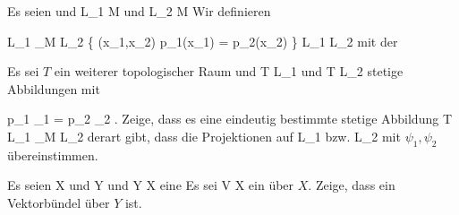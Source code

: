 {}
{





Es seien
und
 {L_1 } { M
} {}
und
 {L_2 } { M
} {}
Wir definieren

\mavergleichskettedisp
{\vergleichskette
{L_1 \times_M L_2
}
{ } { \left\{ (x_1,x_2)  \mid   p_1(x_1) = p_2(x_2)         \right\}
}
{ \subseteq} { L_1 \times L_2
}
{ } {
}
{ } {
}
}
{}{}{}
mit der
 {Es sei $T$ ein weiterer topologischer Raum und
 { T } { L_1
} {}
und
 { T } { L_2
} {}
stetige Abbildungen mit

\mavergleichskettedisp
{\vergleichskette
{ p_1 \circ \psi_1
}
{ =} { p_2 \circ \psi_2
}
{ } {
}
{ } {
}
{ } {}
}
{}{}{.}
Zeige, dass es eine eindeutig bestimmte stetige Abbildung
\maabbdisp {\psi} { T } { L_1 \times_M L_2
} {}
derart gibt, dass die Projektionen auf
\mathkor {} {L_1} {bzw.} {L_2} {}
mit $\psi_1,\psi_2$ übereinstimmen.
}





}
{} {}

{}
{





Es seien
\mathkor {} {X} {und} {Y} {}
und
\maabb {\varphi} { Y } { X
} {}
eine
Es sei
 { V } { X
} {}
ein
über $X$. Zeige, dass
 {} {}
ein Vektorbündel über $Y$ ist.





}
{} {}

